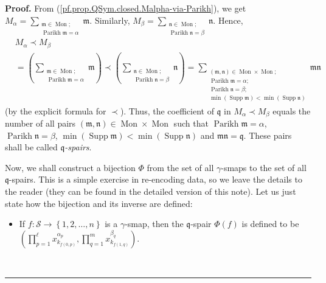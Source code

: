 \documentclass
[numbers=enddot,12pt,final,onecolumn,notitlepage,abstracton]{scrartcl}%
\theoremstyle{definition}
\newenvironment{proof}[1][Proof]{\noindent\textbf{#1.} }{\ \rule{0.5em}{0.5em}}
\newenvironment{vershort}{}{}
\let\sumnonlimits\sum
\let\prodnonlimits\prod
\renewcommand{\sum}{\sumnonlimits\limits}
\renewcommand{\prod}{\prodnonlimits\limits}
\begin{document}
\begin{proof}
\begin{vershort}
From (\ref{pf.prop.QSym.closed.Malpha-via-Parikh}), we get $M_{\alpha}%
=\sum_{\substack{\mathfrak{m}\in\operatorname*{Mon};\\\operatorname*{Parikh}%
\mathfrak{m}=\alpha}}\mathfrak{m}$. Similarly, $M_{\beta}=\sum
_{\substack{\mathfrak{n}\in\operatorname*{Mon};\\\operatorname*{Parikh}%
\mathfrak{n}=\beta}}\mathfrak{n}$. Hence,%
\begin{align*}
&  M_{\alpha}\left.  \prec\right.  M_{\beta}\\
&  =\left(  \sum_{\substack{\mathfrak{m}\in\operatorname*{Mon}%
;\\\operatorname*{Parikh}\mathfrak{m}=\alpha}}\mathfrak{m}\right)  \left.
\prec\right.  \left(  \sum_{\substack{\mathfrak{n}\in\operatorname*{Mon}%
;\\\operatorname*{Parikh}\mathfrak{n}=\beta}}\mathfrak{n}\right)
=\sum_{\substack{\left(  \mathfrak{m},\mathfrak{n}\right)  \in
\operatorname*{Mon}\times\operatorname*{Mon};\\\operatorname*{Parikh}%
\mathfrak{m}=\alpha;\\\operatorname*{Parikh}\mathfrak{n}=\beta;\\\min\left(
\operatorname*{Supp}\mathfrak{m}\right)  <\min\left(  \operatorname*{Supp}%
\mathfrak{n}\right)  }}\mathfrak{mn}%
\end{align*}
(by the explicit formula for $\left.  \prec\right.  $). Thus, the coefficient
of $\mathfrak{q}$ in $M_{\alpha}\left.  \prec\right.  M_{\beta}$ equals the
number of all pairs $\left(  \mathfrak{m},\mathfrak{n}\right)  \in
\operatorname*{Mon}\times\operatorname*{Mon}$ such that
$\operatorname*{Parikh}\mathfrak{m}=\alpha$, $\operatorname*{Parikh}%
\mathfrak{n}=\beta$, $\min\left(  \operatorname*{Supp}\mathfrak{m}\right)
<\min\left(  \operatorname*{Supp}\mathfrak{n}\right)  $ and $\mathfrak{mn}%
=\mathfrak{q}$. These pairs shall be called $\mathfrak{q}$\textit{-spairs}.

Now, we shall construct a bijection $\Phi$ from the set of all $\gamma$-smaps
to the set of all $\mathfrak{q}$-spairs. This is a simple exercise in
re-encoding data, so we leave the details to the reader (they can be found in
the detailed version of this note). Let us just state how the bijection and
its inverse are defined:

\begin{itemize}
\item If $f:\mathcal{S}\rightarrow\left\{  1,2,\ldots,n\right\}  $ is a
$\gamma$-smap, then the $\mathfrak{q}$-spair $\Phi\left(  f\right)  $ is
defined to be $\left(  \prod_{p=1}^{\ell}x_{k_{f\left(  0,p\right)  }}%
^{\alpha_{p}},\prod_{q=1}^{m}x_{k_{f\left(  1,q\right)  }}^{\beta_{q}}\right)
$.


\end{itemize}
\end{vershort}
\end{proof}
\end{document}
